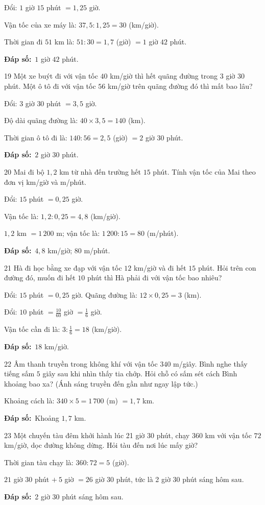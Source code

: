 \documentclass[11pt]{article}
\newif\ifsol \solfalse
\providecommand{\AnsWord}{Đáp số}
\newcommand{\dapso}[1]{\par\textbf{\AnsWord:}\ #1}
\newcommand{\probsol}[1]{%
  \begin{lrbox}{\solmeasure}\begin{minipage}{\dimexpr\linewidth-24pt\relax}#1\end{minipage}\end{lrbox}%
  \ifsol
    \begin{solbox}#1\end{solbox}%
  \else
    \setlength{\solht}{\dimexpr\ht\solmeasure+\dp\solmeasure+0.85cm\relax}%
    \ifdim\solht<1.35cm\setlength{\solht}{1.35cm}\fi
    \begin{tcolorbox}[colback=white,colframe=Line,boxrule=0.8pt,arc=5pt,
      left=8pt,right=8pt,top=4pt,bottom=4pt,height=\solht]{\footnotesize\color{Slate}\itshape\WorkWord}\end{tcolorbox}%
  \fi}
\newcommand{\gap}{\vspace{0.3cm}}
\def\WorkWord{Bài làm:}
\def\AnsWord{Đáp số}
\begin{document}
\probsol{
Đổi: $1$ giờ $15$ phút $=1{,}25$ giờ.\par
Vận tốc của xe máy là: $37{,}5:1{,}25=30$ (km/giờ).\par
Thời gian đi $51$ km là: $51:30=1{,}7$ (giờ) $=1$ giờ $42$ phút.
\dapso{$1$ giờ $42$ phút.}}
\gap
\begin{probbox}{19}{\relax}
Một xe buýt đi với vận tốc $40$ km/giờ thì hết quãng đường trong $3$ giờ $30$ phút. Một ô tô đi với vận tốc $56$ km/giờ trên quãng đường đó thì mất bao lâu?
\end{probbox}
\probsol{
Đổi: $3$ giờ $30$ phút $=3{,}5$ giờ.\par
Độ dài quãng đường là: $40\times3{,}5=140$ (km).\par
Thời gian ô tô đi là: $140:56=2{,}5$ (giờ) $=2$ giờ $30$ phút.
\dapso{$2$ giờ $30$ phút.}}
\gap
\begin{probbox}{20}{\relax}
Mai đi bộ $1{,}2$ km từ nhà đến trường hết $15$ phút. Tính vận tốc của Mai theo đơn vị km/giờ và m/phút.
\end{probbox}
\probsol{
Đổi: $15$ phút $=0{,}25$ giờ.\par
Vận tốc là: $1{,}2:0{,}25=4{,}8$ (km/giờ).\par
$1{,}2$ km $=1\,200$ m; vận tốc là: $1\,200:15=80$ (m/phút).
\dapso{$4{,}8$ km/giờ; $80$ m/phút.}}
\gap
\begin{probbox}{21}{\relax}
Hà đi học bằng xe đạp với vận tốc $12$ km/giờ và đi hết $15$ phút. Hỏi trên con đường đó, muốn đi hết $10$ phút thì Hà phải đi với vận tốc bao nhiêu?
\end{probbox}
\probsol{
Đổi: $15$ phút $=0{,}25$ giờ. Quãng đường là: $12\times0{,}25=3$ (km).\par
Đổi: $10$ phút $=\frac{10}{60}$ giờ $=\frac16$ giờ.\par
Vận tốc cần đi là: $3:\frac16=18$ (km/giờ).
\dapso{$18$ km/giờ.}}
\gap
\begin{probbox}{22}{\relax}
Âm thanh truyền trong không khí với vận tốc $340$ m/giây. Bình nghe thấy tiếng sấm $5$ giây sau khi nhìn thấy tia chớp. Hỏi chỗ có sấm sét cách Bình khoảng bao xa? (Ánh sáng truyền đến gần như ngay lập tức.)
\end{probbox}
\probsol{
Khoảng cách là: $340\times5=1\,700$ (m) $=1{,}7$ km.
\dapso{Khoảng $1{,}7$ km.}}
\gap
\begin{probbox}{23}{\relax}
Một chuyến tàu đêm khởi hành lúc 21 giờ 30 phút, chạy $360$ km với vận tốc $72$ km/giờ, dọc đường không dừng. Hỏi tàu đến nơi lúc mấy giờ?
\end{probbox}
\probsol{
Thời gian tàu chạy là: $360:72=5$ (giờ).\par
$21$ giờ $30$ phút $+\ 5$ giờ $=26$ giờ $30$ phút, tức là 2 giờ 30 phút sáng hôm sau.
\dapso{2 giờ 30 phút sáng hôm sau.}}
\end{document}
